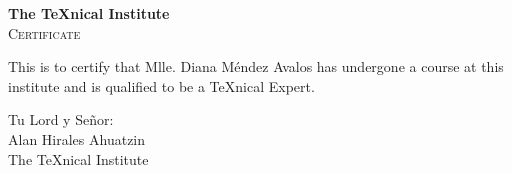 \documentclass{article}
\begin{document}
\begin{center}
  {\bfseries\huge The \TeX nical Institute}\\[1cm]
    {\scshape\LARGE Certificate}
\end{center}

\noindent This is to certify that Mlle. Diana M\'{e}ndez Avalos has undergone a
course at this institute and is qualified to be a \TeX nical Expert.

\begin{flushright}
{\sffamily Tu Lord y Se\~nor:\\
Alan Hirales Ahuatzin}\\[5 pt ]
The \TeX nical Institute
\end{flushright}
\end{document}
